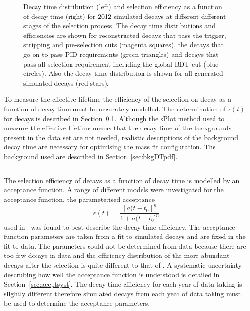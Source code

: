 \begin{figure}[htbp]
\begin{subfigure}[b]{0.48\textwidth}
   \end{subfigure}
    \caption{Decay time distribution (left) and selection efficiency as a function of decay time (right) for 2012 \bsmumu simulated decays at different different stages of the selection process. The decay time distributions and efficiencies are shown for reconstructed decays that pass the trigger, stripping and pre-selection cuts (magenta squares), the decays that go on to pass PID requirements (green triangles) and decays that pass all selection requirement including the global BDT cut (blue circles). Also the decay time distribution is shown for all generated simulated decays (red stars).} %
    \label{fig:accpteg}
\end{figure}

To measure the \bsmumu effective lifetime the efficiency of the selection on \bsmumu decay as a function of decay time must be accurately modelled. The determination of $\epsilon(t)$ for \bsmumu decays is described in Section~\ref{sec:signalDTpdf}. Although the sPlot method used to measure the \bsmumu effective lifetime means that the decay time \pdfs of the backgrounds present in the data set are not needed, realistic  descriptions of the background decay time \pdfs are necessary for optimising the mass fit configuration. The background \pdfs used are described in Section~\ref{sec:bkgDTpdf}.


\subsection{\bsmumu}%
\label{sec:signalDTpdf}
The selection efficiency of \bsmumu decays as a function of decay time is modelled by an acceptance function. A range of different models were investigated for the acceptance function, the parameterised acceptance 
\begin{equation}
\epsilon(t) = \frac{[a(t - t_{0}]^{n}}{1 + a(t - t_{0}]^{n}}
\label{eq:accpt}
\end{equation}
used in~\cite{LHCb:2011ab} was found to best describe the \bsmumu decay time efficiency. The acceptance function parameters are taken from a fit to simulated \bsmumu decays and are fixed in the fit to data. The parameters could not be determined from data because there are too few \bsmumu decays in data and the efficiency distribution of the more abundant \bhh decays after the selection is quite different to that of \bsmumu. A systematic uncertainty descrubing how well the acceptance function is understood is detailed in Section~\ref{sec:accptsyst}. The decay time efficiency for each year of data taking is slightly different therefore simulated decays from each year of data taking must be used to determine the acceptance parameters.


